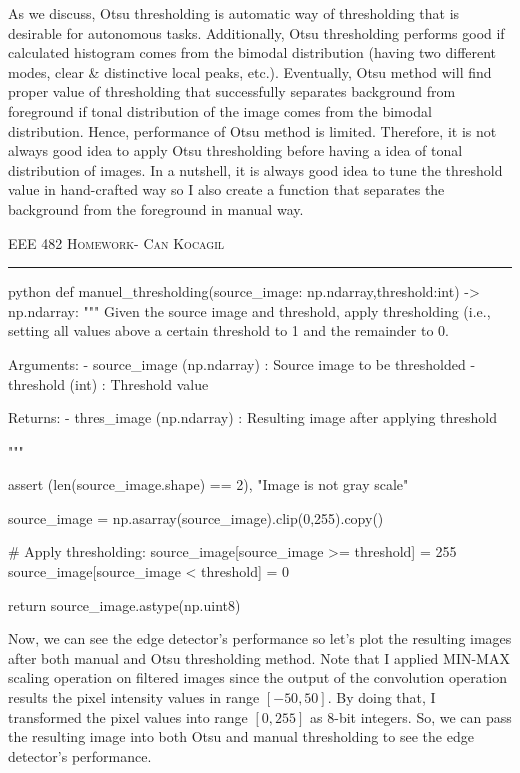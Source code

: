 \documentclass[12pt]{amsart}
\begin{document}
As we discuss, Otsu thresholding is automatic way of thresholding that is desirable for autonomous tasks. Additionally, Otsu thresholding performs good if calculated histogram comes from the bimodal distribution (having two different modes, clear \& distinctive local peaks, etc.). Eventually, Otsu method will find proper value of thresholding that successfully separates background from foreground if tonal distribution of the image comes from the bimodal distribution. Hence, performance of Otsu method is limited. Therefore, it is not always good idea to apply Otsu thresholding before having a idea of tonal distribution of images. In a nutshell, it is always good idea to tune the threshold value in hand-crafted way so I also create a function that separates the background from the foreground in manual way.

\newpage
{\scshape EEE 482} \hfill {\scshape \large  Homework-\relax} \hfill {\scshape Can Kocagil}
\smallskip
\hrule
\vspace{2mm}


\begin{mintedbox}{python}
def manuel_thresholding(source_image: np.ndarray,threshold:int) -> np.ndarray:
    """
        Given the source image and threshold, apply thresholding (i.e., setting all values above a certain threshold to 1 and the remainder to 0.

            Arguments:
                - source_image (np.ndarray) : Source image to be thresholded
                - threshold    (int)        : Threshold value

            Returns:   
                - thres_image  (np.ndarray) : Resulting image after applying threshold

    """

    
    assert (len(source_image.shape) == 2), "Image is not gray scale"     
    
    source_image =  np.asarray(source_image).clip(0,255).copy()

    # Apply thresholding:
    source_image[source_image >= threshold] = 255
    source_image[source_image < threshold] = 0

    return source_image.astype(np.uint8)
\end{mintedbox}

Now, we can see the edge detector's performance so let's plot the resulting images after both manual and Otsu thresholding method. Note that I applied MIN-MAX scaling operation on filtered images since the output of the convolution operation results the pixel intensity values in range $[-50,50]$. By doing that, I transformed the pixel values into range $[0,255]$ as 8-bit integers. So, we can pass the resulting image into both Otsu and manual thresholding to see the edge detector's performance.
\end{document}
